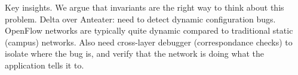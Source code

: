 
Key insights. We argue that invariants are the right way to think about this
problem. Delta over Anteater: need to detect dynamic configuration bugs.
OpenFlow networks are typically quite dynamic compared to traditional static
(campus) networks. Also need cross-layer debugger (correspondance checks) to isolate where the bug is,
and verify that the network is doing what the application tells it to.



